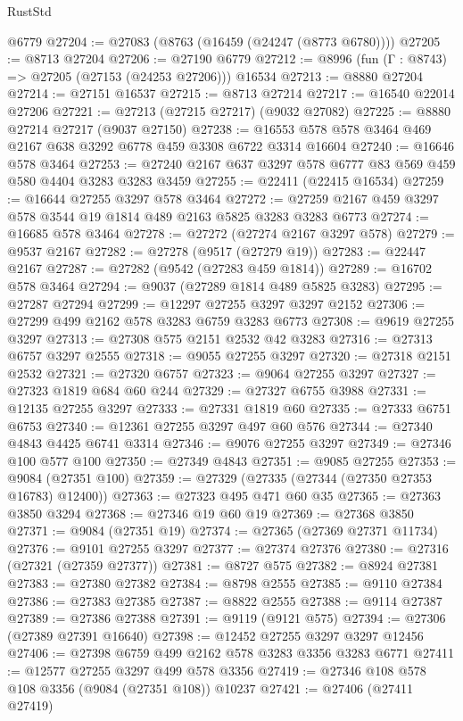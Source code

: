 \begin{lexlean}{RustStd}
\begin{coremodule}
    @6779
@27204 := @27083 (@8763 (@16459 (@24247 (@8773 @6780))))
@27205 := @8713 @27204
@27206 := @27190 @6779
@27212 := @8996 (fun (Γ : @8743) => @27205 (@27153 (@24253 @27206))) @16534
@27213 := @8880 @27204
@27214 := @27151 @16537
@27215 := @8713 @27214
@27217 := @16540 @22014 @27206
@27221 := @27213 (@27215 @27217) (@9032 @27082)
@27225 := @8880 @27214 @27217 (@9037 @27150)
@27238 := @16553 @578 @578 @3464 @469 @2167 @638 @3292 @6778 @459 @3308 @6722 @3314 @16604
@27240 := @16646 @578 @3464
@27253 := @27240 @2167 @637 @3297 @578 @6777 @83 @569 @459 @580 @4404 @3283 @3283 @3459
@27255 := @22411 (@22415 @16534)
@27259 := @16644 @27255 @3297 @578 @3464
@27272 := @27259 @2167 @459 @3297 @578 @3544 @19 @1814 @489 @2163 @5825 @3283 @3283 @6773
@27274 := @16685 @578 @3464
@27278 := @27272 (@27274 @2167 @3297 @578)
@27279 := @9537 @2167
@27282 := @27278 (@9517 (@27279 @19))
@27283 := @22447 @2167
@27287 := @27282 (@9542 (@27283 @459 @1814))
@27289 := @16702 @578 @3464
@27294 := @9037 (@27289 @1814 @489 @5825 @3283)
@27295 := @27287 @27294
@27299 := @12297 @27255 @3297 @3297 @2152
@27306 := @27299 @499 @2162 @578 @3283 @6759 @3283 @6773
@27308 := @9619 @27255 @3297
@27313 := @27308 @575 @2151 @2532 @42 @3283
@27316 := @27313 @6757 @3297 @2555
@27318 := @9055 @27255 @3297
@27320 := @27318 @2151 @2532
@27321 := @27320 @6757
@27323 := @9064 @27255 @3297
@27327 := @27323 @1819 @684 @60 @244
@27329 := @27327 @6755 @3988
@27331 := @12135 @27255 @3297
@27333 := @27331 @1819 @60
@27335 := @27333 @6751 @6753
@27340 := @12361 @27255 @3297 @497 @60 @576
@27344 := @27340 @4843 @4425 @6741 @3314
@27346 := @9076 @27255 @3297
@27349 := @27346 @100 @577 @100
@27350 := @27349 @4843
@27351 := @9085 @27255
@27353 := @9084 (@27351 @100)
@27359 := @27329 (@27335 (@27344 (@27350 @27353 @16783) @12400))
@27363 := @27323 @495 @471 @60 @35
@27365 := @27363 @3850 @3294
@27368 := @27346 @19 @60 @19
@27369 := @27368 @3850
@27371 := @9084 (@27351 @19)
@27374 := @27365 (@27369 @27371 @11734)
@27376 := @9101 @27255 @3297
@27377 := @27374 @27376
@27380 := @27316 (@27321 (@27359 @27377))
@27381 := @8727 @575
@27382 := @8924 @27381
@27383 := @27380 @27382
@27384 := @8798 @2555
@27385 := @9110 @27384
@27386 := @27383 @27385
@27387 := @8822 @2555
@27388 := @9114 @27387
@27389 := @27386 @27388
@27391 := @9119 (@9121 @575)
@27394 := @27306 (@27389 @27391 @16640)
@27398 := @12452 @27255 @3297 @3297 @12456
@27406 := @27398 @6759 @499 @2162 @578 @3283 @3356 @3283 @6771
@27411 := @12577 @27255 @3297 @499 @578 @3356
@27419 := @27346 @108 @578 @108 @3356 (@9084 (@27351 @108)) @10237
@27421 := @27406 (@27411 @27419)

\end{coremodule}
\end{lexlean}
